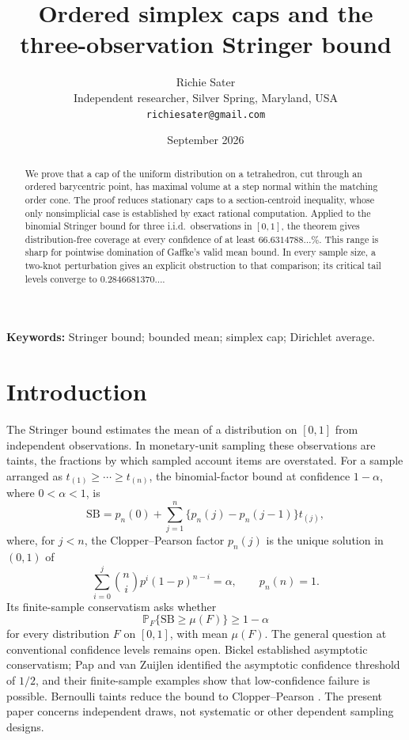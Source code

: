 \documentclass[11pt]{article}
\title{Ordered simplex caps and the three-observation Stringer bound}
\author{Richie Sater\\
\small Independent researcher, Silver Spring, Maryland, USA\\
\small \texttt{richiesater@gmail.com}}
\date{September 2026}
\theoremstyle{definition}
\newcommand{\SB}{\mathrm{SB}}
\newcommand{\pr}{\mathbb{P}}
\begin{document}
\maketitle

\begin{abstract}
We prove that a cap of the uniform distribution on a tetrahedron, cut through an ordered
barycentric point, has maximal volume at a step normal within the matching
order cone. The proof reduces stationary caps to a section-centroid
inequality, whose only nonsimplicial case is established by exact rational
computation. Applied to the binomial Stringer bound for three i.i.d.\ observations in $[0,1]$, the theorem gives distribution-free coverage at
every confidence of at least $66.6314788\ldots\%$. This range is sharp for
pointwise domination of Gaffke's valid mean bound. In every sample size, a
two-knot perturbation gives an explicit obstruction to that comparison;
its critical tail levels converge to $0.2846681370\ldots$.
\end{abstract}

\noindent\textbf{Keywords:} Stringer bound; bounded mean; simplex cap;
Dirichlet average.

\section{Introduction}

The Stringer bound \cite{stringer1963} estimates the mean of a distribution
on $[0,1]$ from independent observations. In monetary-unit sampling these
observations are taints, the fractions by which sampled account items are
overstated. For a sample arranged as $t_{(1)}\ge\cdots\ge t_{(n)}$, the
binomial-factor bound at confidence $1-\alpha$, where $0<\alpha<1$, is
\begin{equation}\label{eq:sb}
 \SB=p_n(0)+\sum_{j=1}^n\{p_n(j)-p_n(j-1)\}t_{(j)},
\end{equation}
where, for $j<n$, the Clopper--Pearson factor $p_n(j)$ is the unique solution
in $(0,1)$ of
\[
 \sum_{i=0}^j\binom ni p^i(1-p)^{n-i}=\alpha,
 \qquad p_n(n)=1.
\]
Its finite-sample conservatism asks whether
\begin{equation}\label{eq:conj}
 \pr_F\{\SB\ge\mu(F)\}\ge1-\alpha
\end{equation}
for every distribution $F$ on $[0,1]$, with mean $\mu(F)$. The general
question at conventional confidence levels remains open. Bickel
\cite{bickel1992} established asymptotic conservatism; Pap and van Zuijlen
\cite{papvz1996} identified the asymptotic confidence threshold of $1/2$,
and their finite-sample examples \cite{papvz1995} show that low-confidence
failure is possible. Bernoulli taints reduce the bound to Clopper--Pearson
\cite{djpvz1997}. The present paper concerns independent draws, not
systematic or other dependent sampling designs.
\end{document}
